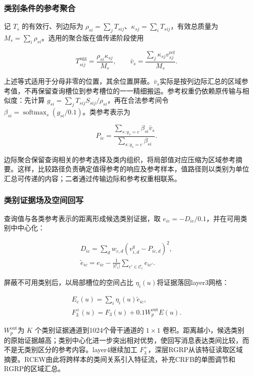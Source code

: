 \documentclass[journal,10pt,a4paper]{IEEEtran}
\begin{document}
\subsubsection{类别条件的参考聚合}\label{ux7c7bux522bux6761ux4ef6ux7684ux53c2ux8003ux805aux5408}

记 \(T_s\) 的有效行、列边际为 \(\rho_{si}=\sum_jT_{sij}\)、\(\kappa_{sj}=\sum_iT_{sij}\)，有效总质量为 \(M_s=\sum_i\rho_{si}\)。选用的聚合版在值传递阶段使用

\[T^{\mathrm{agg}}_{sij}=\frac{\rho_{si}\kappa_{sj}}{M_s},\qquad \bar v_s=\frac{\sum_j\kappa_{sj}v^{\mathrm{ref}}_{sj}}{M_s}.\tag{11}\]

上述等式适用于分母非零的位置，其余位置屏蔽。\(\bar v_s\)实际是按列边际汇总的区域参考值，不再保留查询槽位到参考槽位的一一精细搬运。参考权重仍依赖原传输与相似度：先计算 \(g_{si}=\sum_jT_{sij}S_{sij}/\rho_{si}\)，再在合法参考间令 \(\beta_{si}=\operatorname{softmax}_s(g_{si}/0.1)\)。类参考表示为

\[P_{ic}=\frac{\sum_{s:y_s=c}\beta_{si}\bar v_s}
{\sum_{s:y_s=c}\beta_{si}}. \tag{12}\]

边际聚合保留查询相关的参考选择及类内组织，将局部值对应压缩为区域参考摘要。这样，比较路径负责确定值得参考的响应及参考样本，值路径则以类别为单位汇总可传递的内容；二者通过传输边际和参考权重相联系。

\subsubsection{类别证据场及空间回写}\label{ux7c7bux522bux8bc1ux636eux573aux53caux7a7aux95f4ux56deux5199}

查询值与各类参考表示的距离形成候选类别证据，取 \(e_{ic}=-D_{ic}/0.1\)，并在可用类别中中心化：

\[\begin{gathered}
D_{ic}=\sum_d w_{c,d}(v^q_{i,d}-P_{ic,d})^2,\\
\widetilde e_{ic}=e_{ic}-\frac{1}{|\mathcal C_i|}\sum_{c'\in\mathcal C_i}e_{ic'}.
\end{gathered}\tag{13}\]

屏蔽不可用类别后，以局部槽位的空间占比 \(\eta_i(u)\)将证据落回layer3网格：

\[\begin{gathered}
E_c(u)=\sum_i\eta_i(u)\widetilde e_{ic},\\
F_3^{+}(u)=F_3(u)+0.1W_p^{\mathrm{out}}E(u).
\end{gathered}\tag{14}\]

\(W_p^{\mathrm{out}}\)为 \(K\) 个类别证据通道到1024个骨干通道的 \(1\times1\) 卷积。距离越小，候选类别的原始证据越高；类别中心化进一步突出相对优势，使回写消息表达类间比较，而不是无类别区分的参考内容。layer4继续加工 \(F_3^{+}\)，深层RGRP从该特征读取区域摘要。RCEW由此将跨样本的类间关系引入特征流，补充CRFB的单图调节和RGRP的区域汇总。
\end{document}
